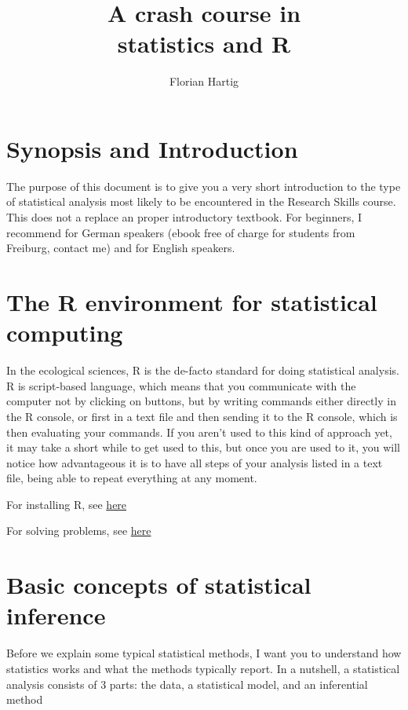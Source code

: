 \documentclass{tufte-book} %
\title{A crash course in\\statistics and R}
\author{Florian Hartig}
\begin{document}
\let\cleardoublepage\clearpage %
\maketitle
\newpage
\tableofcontents

\chapter{Synopsis and Introduction} %

The purpose of this document is to give you a very short introduction to the type of statistical analysis most likely to be encountered in the Research Skills course. This does not a replace an proper introductory textbook. For beginners, I recommend \citep{Dormann-ParametrischeStatistik-2013} for German speakers (ebook free of charge for students from Freiburg, contact me) and \citep{Gotelli-PrimerEcologicalStatistics-2004} for English speakers. 
 
\chapter{The R environment for statistical computing}

In the ecological sciences, R is the de-facto standard for doing statistical analysis. R is script-based language, which means that you communicate with the computer not by clicking on buttons, but by writing commands either directly in the R console, or first in a text file and then sending it to the R console, which is then evaluating your commands. If you aren't used to this kind of approach yet, it may take a short while to get used to this, but once you are used to it, you will notice how advantageous it is to have all steps of your analysis listed in a text file, being able to repeat everything at any moment.





For installing R, see \href{http://biometry.github.io/APES/R/R10-gettingStarted.html}{here}

For solving problems, see \href{http://biometry.github.io/APES/R/R80-solvingProblems.html}{here}


\chapter{Basic concepts of statistical inference}

Before we explain some typical statistical methods, I want you to understand how statistics works and what the methods typically report. In a nutshell, a statistical analysis consists of 3 parts: the data, a statistical model, and an inferential method
\end{document}
